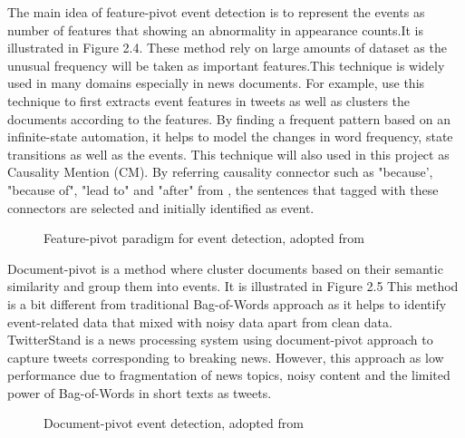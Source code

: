 \documentclass[twoside]{utmthesis}
\begin{document}
The main idea of feature-pivot event detection is to represent the events as number of features that showing an abnormality in appearance counts.It is illustrated in Figure 2.4. These method rely on large amounts of dataset as the unusual frequency will be taken as important features.This technique is widely used in many domains especially in news documents. For example, \cite{mele2019event} use this technique to first extracts event features in tweets as well as clusters the documents according to the features. By finding a frequent pattern based on an infinite-state automation, it helps to model the changes in word frequency, state transitions as well as the events. This technique will also used in this project as Causality Mention (CM). By referring causality connector such as "because', "because of", "lead to" and "after" from \cite{zhao2017constructing}, the sentences that tagged with these connectors are selected and initially identified as event. 

\begin{figure}[H]
	\centering
	\caption{Feature-pivot paradigm for event detection, adopted from \cite{schinas2018event}}
	\label{fig:featurepivot}
\end{figure}
\vspace{-1.5cm}

Document-pivot is a method where cluster documents based on their semantic similarity and group them into events. It is illustrated in Figure 2.5 This method is a bit different from traditional Bag-of-Words approach as it helps to identify event-related data that mixed with noisy data apart from clean data. TwitterStand \citep{sankaranarayanan2009twitterstand} is a news processing system using document-pivot approach to capture tweets corresponding to breaking news. However, this approach as low performance due to fragmentation of news topics, noisy content and the limited power of Bag-of-Words in short texts as tweets.  

\begin{figure}[H]
	\centering
	\caption{Document-pivot event detection, adopted from \cite{schinas2018event}}
	\label{fig:documentpivot}
\end{figure}
\vspace{-1.5cm}
\end{document}
